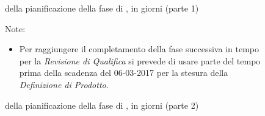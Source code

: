 \begin{figure}[H]
\label{tab:ganttpa1}
\caption{ della pianificazione della fase di \PA, in giorni (parte 1)}
\end{figure}

\begin{figure}[H]
\label{tab:ganttpa2}
\caption{ della pianificazione della fase di \PA, in giorni (parte 2)}

Note:
\begin{itemize}
\item Per raggiungere il completamento della fase successiva in tempo per la \emph{Revisione di Qualifica} si prevede di usare parte del tempo prima della scadenza del 06-03-2017 per la stesura della \emph{Definizione di Prodotto}.
\end{itemize} 
\end{figure}


